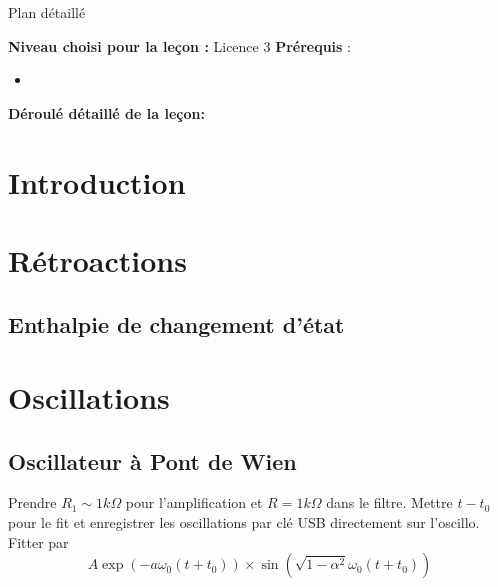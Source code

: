 \begin{reportBlock}{Plan détaillé}

  \textbf{Niveau choisi pour la leçon :} Licence 3
  \newline
  \textbf{Prérequis} : \begin{itemize}
      \item 
  \end{itemize}

  \textbf{Déroulé détaillé de la leçon: }  
  
  \section*{Introduction}

  \section{Rétroactions}
  \subsection{Enthalpie de changement d'état} 


  \section{Oscillations}
\subsection{Oscillateur à Pont de Wien}
Prendre $R_1\sim 1k\Omega$ pour l'amplification et $R=1k\Omega$ dans le filtre. Mettre $t-t_0$ pour le fit et enregistrer les oscillations par clé USB directement sur l'oscillo. Fitter par 
\begin{equation}
    A\exp\left(-a\omega_0(t+t_0)\right)\times\sin\left(\sqrt{1-\alpha^2}\omega_0(t+t_0)\right)
\end{equation}


\end{reportBlock}